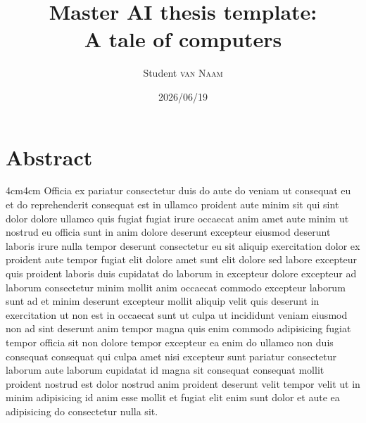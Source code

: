 \documentclass{mscaithesis}
\title{Master AI thesis template:\\A tale of computers}
\date{2026/06/19}
\author{Student \textsc{van Naam}}
\begin{document}
\maketitle

\frontmatter
        \chapter*{Abstract}
                \begin{adjustwidth}{4cm}{4cm}
                        Officia ex pariatur consectetur duis do aute do veniam ut consequat eu et do reprehenderit consequat est in ullamco proident aute minim sit qui sint dolor dolore ullamco quis fugiat fugiat irure occaecat anim amet aute minim ut nostrud eu officia sunt in anim dolore deserunt excepteur eiusmod deserunt laboris irure nulla tempor deserunt consectetur eu sit aliquip exercitation dolor ex proident aute tempor fugiat elit dolore amet sunt elit dolore sed labore excepteur quis proident laboris duis cupidatat do laborum in excepteur dolore excepteur ad laborum consectetur minim mollit anim occaecat commodo excepteur laborum sunt ad et minim deserunt excepteur mollit aliquip velit quis deserunt in exercitation ut non est in occaecat sunt ut culpa ut incididunt veniam eiusmod non ad sint deserunt anim tempor magna quis enim commodo adipisicing fugiat tempor officia sit non dolore tempor excepteur ea enim do ullamco non duis consequat consequat qui culpa amet nisi excepteur sunt pariatur consectetur laborum aute laborum cupidatat id magna sit consequat consequat mollit proident nostrud est dolor nostrud anim proident deserunt velit tempor velit ut in minim adipisicing id anim esse mollit et fugiat elit enim sunt dolor et aute ea adipisicing do consectetur nulla sit.
                \end{adjustwidth}

\tableofcontents

\listoffigures

\listoftables

\setlength{\parskip}{5pt}




\twocolumn
\mainmatter
        
        
        
        
        
        




\appendix
        
\end{document}
